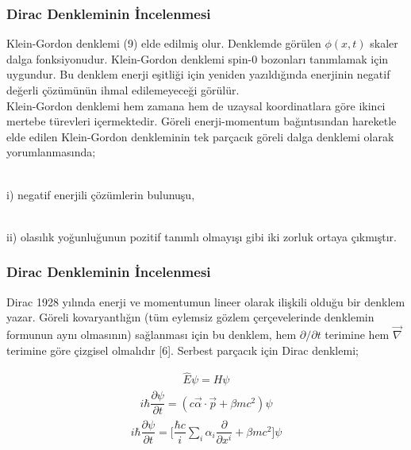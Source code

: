 \documentclass[aspectratio=169,10pt]{beamer}
\begin{document}
	\begin{frame}[allowframebreaks]
\frametitle{Dirac Denkleminin İncelenmesi}


Klein-Gordon denklemi (9) elde edilmiş olur. Denklemde görülen $\phi(x,t) $ skaler dalga fonksiyonudur. Klein-Gordon denklemi spin-0 bozonları tanımlamak için uygundur. Bu denklem enerji eşitliği için yeniden yazıldığında enerjinin negatif değerli çözümünün ihmal edilemeyeceği görülür. \\ 
Klein-Gordon denklemi hem zamana hem de uzaysal koordinatlara göre ikinci mertebe türevleri içermektedir. Göreli enerji-momentum bağıntısından hareketle elde edilen Klein-Gordon denkleminin tek parçacık göreli dalga denklemi olarak yorumlanmasında; \\

\

i)   negatif enerjili çözümlerin bulunuşu, \\

\

ii) olasılık yoğunluğunun pozitif tanımlı olmayışı gibi iki zorluk ortaya çıkmıştır.



\end{frame}

	\begin{frame}[allowframebreaks]
\frametitle{Dirac Denkleminin İncelenmesi}

Dirac 1928 yılında enerji ve momentumun lineer olarak ilişkili olduğu bir denklem yazar. Göreli kovaryantlığın (tüm eylemsiz gözlem çerçevelerinde denklemin formunun aynı olmasının) sağlanması için bu denklem, hem $\partial / \partial t$ terimine hem $ \Vec{\nabla}$ terimine göre çizgisel olmalıdır [6]. Serbest parçacık için Dirac denklemi;

\begin{align}
    \hat{E} \psi = H\psi
\end{align}
\begin{align}
    i \hbar \dfrac{\partial \psi}{\partial t} = ( c \Vec{\alpha} \cdot \Vec{p} + \beta mc^{2} ) \psi
\end{align}
\begin{align}
    i \hbar  \dfrac{\partial \psi}{\partial t} = \Bigg[  \dfrac{\hbar c}{i} \sum_{i} \alpha_{i} \dfrac{\partial}{\partial x^{i}}  + \beta mc^{2} \Bigg] \psi
\end{align}



\end{frame}
\end{document}
